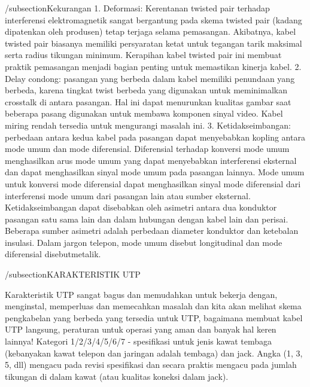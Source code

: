 /subsection{Kekurangan}
1. Deformasi: Kerentanan twisted pair terhadap interferensi elektromagnetik sangat bergantung pada skema twisted pair (kadang dipatenkan oleh produsen) tetap terjaga selama pemasangan. Akibatnya, kabel twisted pair biasanya memiliki persyaratan ketat untuk tegangan tarik maksimal serta radius tikungan minimum. Kerapihan kabel twisted pair ini membuat praktik pemasangan menjadi bagian penting untuk memastikan kinerja kabel.
2. Delay condong: pasangan yang berbeda dalam kabel memiliki penundaan yang berbeda, karena tingkat twist berbeda yang digunakan untuk meminimalkan crosstalk di antara pasangan. Hal ini dapat menurunkan kualitas gambar saat beberapa pasang digunakan untuk membawa komponen sinyal video. Kabel miring rendah tersedia untuk mengurangi masalah ini.
3. Ketidakseimbangan: perbedaan antara kedua kabel pada pasangan dapat menyebabkan kopling antara mode umum dan mode diferensial. Diferensial terhadap konversi mode umum menghasilkan arus mode umum yang dapat menyebabkan interferensi eksternal dan dapat menghasilkan sinyal mode umum pada pasangan lainnya. Mode umum untuk konversi mode diferensial dapat menghasilkan sinyal mode diferensial dari interferensi mode umum dari pasangan lain atau sumber eksternal. Ketidakseimbangan dapat disebabkan oleh asimetri antara dua konduktor pasangan satu sama lain dan dalam hubungan dengan kabel lain dan perisai. Beberapa sumber asimetri adalah perbedaan diameter konduktor dan ketebalan insulasi. Dalam jargon telepon, mode umum disebut longitudinal dan mode diferensial disebutmetalik.

/subsection{KARAKTERISTIK UTP}

Karakteristik UTP sangat bagus dan memudahkan untuk bekerja dengan, menginstal, memperluas dan memecahkan masalah dan kita akan melihat skema pengkabelan yang berbeda yang tersedia untuk UTP, bagaimana membuat kabel UTP langsung, peraturan untuk operasi yang aman dan banyak hal keren lainnya!
Kategori 1/2/3/4/5/6/7 - spesifikasi untuk jenis kawat tembaga (kebanyakan kawat telepon dan jaringan adalah tembaga) dan jack. Angka (1, 3, 5, dll) mengacu pada revisi spesifikasi dan secara praktis mengacu pada jumlah tikungan di dalam kawat (atau kualitas koneksi dalam jack).


